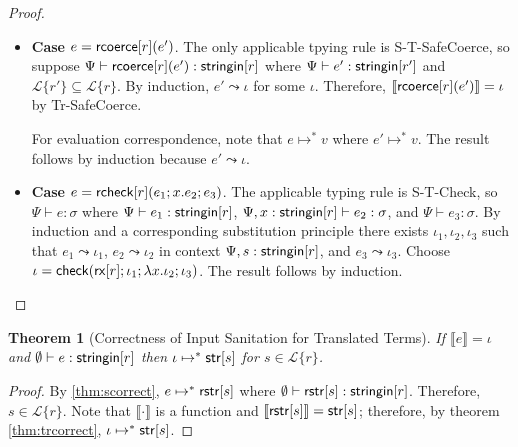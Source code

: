 \documentclass[11pt,leqno]{article}
\newtheorem{thm}{Theorem}
\theoremstyle{definition}
\newcommand{\Lagr}{\mathcal{L}}
\newcommand{\lang}[1]{\Lagr\{#1\}}
\newcommand{\coerce}[2]{ {\sf rcoerce}[#1](#2)}
\newcommand{\rcoerce}[2]{{\sf rcoerce}[#1](#2)}
\newcommand{\rcheck}[4]{ {\sf rcheck}[#1](#2;#3;#4) }
\newcommand{\stringin}[1]{{\sf stringin}[#1]}
\newcommand{\tcheck}[4]{{\sf check}(#1; #2; #3; #4)}
\renewcommand{\tstr}[1]{{{\sf str}[#1]}}
\newcommand{\treplace}[3]{{\sf replace}(#1;#2;#3)}
\newcommand{\rx}[1]{ {\sf rx}[#1] }
\newcommand{\lreplace}[3]{{\sf lreplace}(#1; #2; #3)}
\newcommand{\sctx}{\Psi} %
\newcommand{\trden}[1]{\llbracket #1 \rrbracket} %
\renewcommand{\lreplace}[3]{{\sf lreplace}(#1, #2, #3)}
\begin{document}
\begin{proof}
\begin{itemize}[label=$ $, itemsep=1ex]
For evaluation correspondence, note that $\trden{ \rstr{\lreplace{r}{s_1}{s_2}} } = \rstr{ \lreplace{r}{s_1}{s_2} }$ and
so it suffices to show that $\treplace{\rx{r}}{\iota_1}{\iota_2} \mapsto^* \rstr{r}{s_1}{s_2}$.
Note that $\lreplace{r}{e_1}{e_2} \mapsto^* \rstr{\lreplace{r}{s_1}{s_2}}$ 
where $e_1 \mapsto^* \rstr{s_1}$, $e_2 \mapsto^* \rstr{s_2}$, $r \mapsto^* r$.
By induction, $\iota_1 \mapsto^* \rstr{s_1}, \iota_2 \mapsto^* \rstr{s_2}$, and $\rx{r} \mapsto^* \rx{r}$.
So by S-E-Replace, the sufficient condition holds.

\item \textbf{Case $e = \rcoerce{r}{e'}$}.
The only applicable tpying rule is S-T-SafeCoerce, so suppose
$\sctx \vdash \rcoerce{r}{e'} : \stringin{r}$ where
$\sctx \vdash e' : \stringin{r'}$ and $\lang{r'} \subseteq \lang{r}$.
By induction, $e' \leadsto \iota$ for some $\iota$.
Therefore, $\trden{\coerce{r}{e'}} = \iota$ by Tr-SafeCoerce.

For evaluation correspondence, note that $e \mapsto^* v$ where
$e' \mapsto^* v$. The result follows by induction because $e' \leadsto \iota$. 

\item \textbf{Case $e = \rcheck{r}{e_1}{x.e_2}{e_3}$}.
The applicable typing rule is S-T-Check,
so $\sctx \vdash e : \sigma$ where 
$\sctx \vdash e_1 : \stringin{r}$,
$\sctx, x : \stringin{r} \vdash e_2 : \sigma$,
and $\sctx \vdash e_3 : \sigma$.
By induction and a corresponding substitution principle there exists $\iota_1, \iota_2, \iota_3$ such that
$e_1 \leadsto \iota_1$, 
$e_2 \leadsto \iota_2$ in context $\sctx, s : \stringin{r}$, and
$e_3 \leadsto \iota_3$.
Choose $\iota = \tcheck{\rx{r}}{\iota_1}{\lambda x . \iota_2}{\iota_3}$.
The result follows by induction.

\end{itemize}
\end{proof}

\begin{thm}[Correctness of Input Sanitation for Translated Terms]\label{thm:main}
  If $\trden{e} = \iota$ and $\emptyset \vdash e : \stringin{r}$ then $\iota \mapsto^* \tstr{s}$
  for $s \in \lang{r}$.
\end{thm}
\begin{proof}
  By \ref{thm:scorrect}, $e \mapsto^* {\sf rstr}[s]$ where $\emptyset \vdash \rstr{s} : \stringin{r}$. 
  Therefore, $s \in \lang{r}$.
  Note that $\trden{\cdot}$ is a function and $\trden{\rstr{s}} = \tstr{s}$; 
  therefore, by theorem \ref{thm:trcorrect}, $\iota \mapsto^* \tstr{s}$.
\end{proof}
\end{document}
